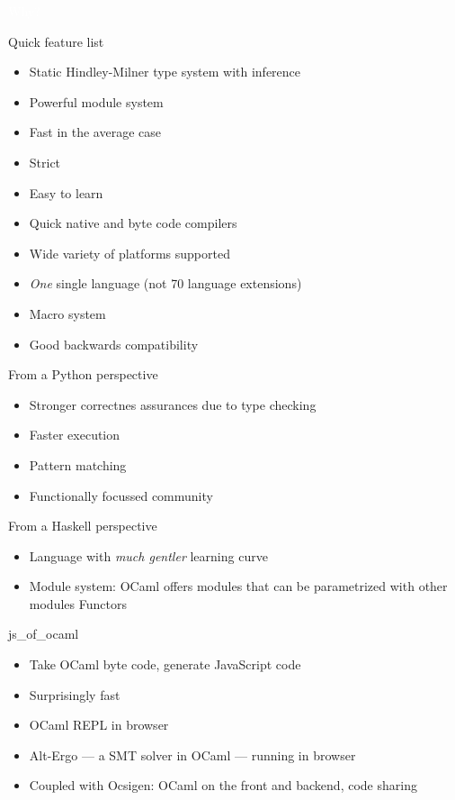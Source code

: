 \documentclass{beamer}
\begin{document}
{
\begin{frame}{}
  \center
  \fontsize{70}{70} \exclaim \textcolor{white}{Why?}
\end{frame}
}

\begin{frame}{Quick feature list}
  \begin{itemize}
    \item Static Hindley-Milner type system with inference
    \item Powerful module system
    \item Fast in the average case
    \item Strict
    \item Easy to learn
    \item Quick native and byte code compilers
    \item Wide variety of platforms supported
    \item \emph{One} single language (not 70 language extensions)
    \item Macro system
    \item Good backwards compatibility
  \end{itemize}
\end{frame}

\begin{frame}{From a Python perspective}
  \begin{itemize}
    \item Stronger correctnes assurances due to type checking
    \item Faster execution
    \item Pattern matching
    \item Functionally focussed community
  \end{itemize}
\end{frame}

\begin{frame}{From a Haskell perspective}
  \begin{itemize}
    \item Language with \emph{much gentler} learning curve
    \item Module system: OCaml offers modules that can be parametrized
      with other modules \rightarrow Functors
  \end{itemize}
\end{frame}

\begin{frame}{js\_of\_ocaml}
  \begin{itemize}
    \item Take OCaml byte code, generate JavaScript code
    \item Surprisingly fast
    \item OCaml REPL in browser
    \item Alt-Ergo — a SMT solver in OCaml — running in browser
    \item Coupled with Ocsigen: OCaml on the front and backend, code sharing
  \end{itemize}
\end{frame}
\end{document}

